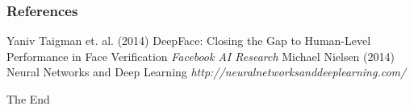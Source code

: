 \documentclass{beamer}
\begin{document}
\begin{frame}
\frametitle{References}
\footnotesize{
    \begin{thebibliography}{99} %
         Yaniv Taigman et. al. (2014)
        \newblock DeepFace: Closing the Gap to Human-Level Performance in Face Verification
        \newblock \emph{Facebook AI Research}
         Michael Nielsen (2014)
        \newblock Neural Networks and Deep Learning
        \newblock \emph{http://neuralnetworksanddeeplearning.com/}
        
    \end{thebibliography}
}
\end{frame}


\begin{frame}
\Huge{\centerline{The End}}
\end{frame}

\end{document}
